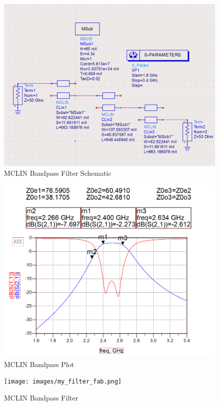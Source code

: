 \documentclass{article}
\begin{document}
\begin{figure}[h!]
    \centering
    \includegraphics[scale=0.4]{images/my_filter_schematic.png}
    \caption{MCLIN Bandpass Filter Schematic}
    \label{fig:24}
\end{figure}
\begin{figure}[h!]
    \centering
    \includegraphics[scale=0.3]{images/my_filter_plot.png}
    \caption{MCLIN Bandpass Plot}
    \label{fig:25}
\end{figure}
\begin{figure}[h!]
    \centering
    \texttt{[image: images/my\_filter\_fab.png]}
    \caption{MCLIN Bandpass Filter}
    \label{fig:26}
\end{figure}

\clearpage
\printbibliography
\end{document}
